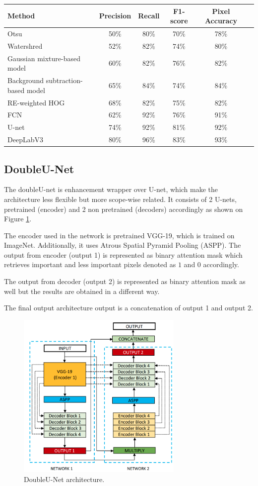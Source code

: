 \begin{table}[htbp]
\centering
\begin{tabular}{|l|c|c|c|c|c} \hline\hline
Method & Precision & Recall & F1-score & Pixel Accuracy\\ \hline
Otsu & 50\% & 80\% & 70\% & 78\%  \\
Watershred & 52\% & 82\% & 74\% & 80\% \\
Gaussian mixture-based model & 60\% & 82\% & 76\% & 82\%  \\
Background subtraction-based model & 65\% & 84\% & 74\% & 84\% \\
RE-weighted HOG & 68\% & 82\% & 75\% & 82\%  \\
FCN & 62\% & 92\% & 76\% & 91\%  \\
U-net & 74\% & 92\% & 81\% & 92\% \\
DeepLabV3 & 80\% & 96\% & 83\% & 93\% \\ 
\hline\hline
\end{tabular}
\end{table} 


\subsection{DoubleU-Net}
The doubleU-net is enhancement wrapper over U-net, which make the architecture less flexible but more scope-wise related. It consists of 2 U-nets, pretrained (encoder) and 2 non pretrained (decoders) accordingly as shown on Figure \ref{fig:double_unet}.

The encoder used in the network is pretrained VGG-19, which is trained on ImageNet. Additionally, it uses Atrous Spatial Pyramid Pooling (ASPP). The output from encoder (output 1) is represented as binary attention mask which retrieves important and less important pixels denoted as $1$ and $0$ accordingly. 

The output from decoder (output 2) is represented as binary attention mask as well but the results are obtained in a different way.

The final output architecture output is a concatenation of output 1 and output 2.

\begin{figure}[h]
    \centering \includegraphics[width=8cm]{images/DoubleU-Net.png}
    \caption {DoubleU-Net architecture.}
    \label{fig:double_unet}
\end{figure}

